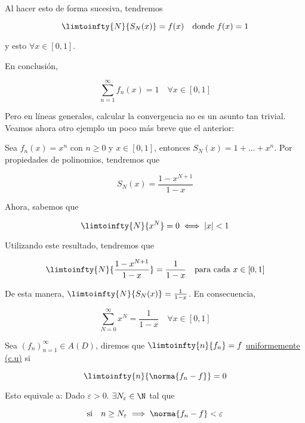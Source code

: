 \begin{ejem}
    Al hacer esto de forma sucesiva, tendremos
    
    \[
    \limtoinfty{N}{S_N(x)} = f(x) \quad \text{donde $f(x) = 1$}
    \]
    
    \noindent y esto $\forall x \in [0,1]$.
    
    En conclusión,
    
    \[
    \sum_{n=1}^{\infty} f_n(x) = 1 \quad \forall x \in [0,1]
    \]
\end{ejem}

Pero en líneas generales, calcular la convergencia no es un asunto tan trivial. Veamos ahora otro ejemplo un poco más breve que el anterior:

\begin{ejem}\label{ej:x^n}
    Sea $f_n(x) = x^n$ con $n\geq0$ y $x \in [0,1]$, entonces $S_N(x) = 1 + \dots + x^n$. Por propiedades de polinomios, tendremos que
    
    \[
    S_N(x) = \frac{1-x^{N+1}}{1-x}
    \]
    
    Ahora, sabemos que
    
    \[
    \limtoinfty{N}{x^N} = 0 \iff |x| < 1
    \]
    
    Utilizando este resultado, tendremos que
    
    \[
    \limtoinfty{N}{\frac{1 - x^{N+1}}{1-x}}  = \frac{1}{1-x} \quad \text{para cada $x \in [0,1]$}
    \]
    
    De esta manera, $\limtoinfty{N}{S_N(x)} = \frac{1}{1-x}$. En consecuencia,
    
    \[
    \sum_{N=0}^{\infty} x^N = \frac{1}{1-x} \quad \forall x \in [0,1]
    \]
\end{ejem}

\begin{defn}
    Sea $\left(f_n\right)_{n=1}^{\infty} \in A(D)$, diremos que $\limtoinfty{n}{f_n} = f$ \ul{uniformemente (c.u)}  si
    
    \[
    \limtoinfty{n}{\norma{f_n - f}} = 0
    \]
    
    Esto equivale a: Dado $\varepsilon > 0$. $\exists N_{\varepsilon} \in \N$ tal que
    
    \[
    \text{si} \quad n \geq N_{\varepsilon} \implies \norma{f_n - f} < \varepsilon
    \]
\end{defn}

